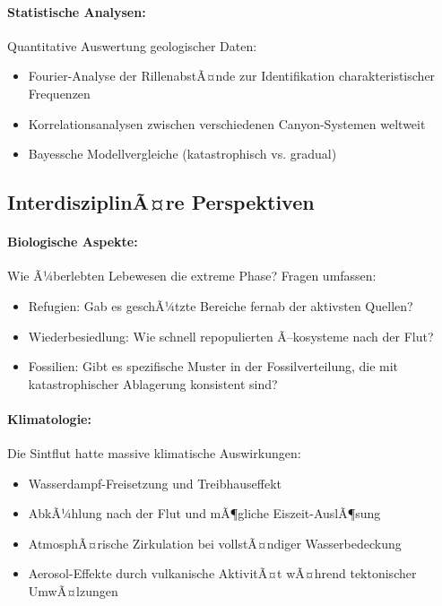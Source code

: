 ﻿\documentclass[12pt,a4paper]{report}
\begin{document}
\paragraph{Statistische Analysen:}
Quantitative Auswertung geologischer Daten:
\begin{itemize}
	\item Fourier-Analyse der RillenabstÃ¤nde zur Identifikation charakteristischer Frequenzen
	\item Korrelationsanalysen zwischen verschiedenen Canyon-Systemen weltweit
	\item Bayessche Modellvergleiche (katastrophisch vs. gradual)
\end{itemize}

\subsection{InterdisziplinÃ¤re Perspektiven}

\paragraph{Biologische Aspekte:}
Wie Ã¼berlebten Lebewesen die extreme Phase? Fragen umfassen:
\begin{itemize}
	\item Refugien: Gab es geschÃ¼tzte Bereiche fernab der aktivsten Quellen?
	\item Wiederbesiedlung: Wie schnell repopulierten Ã–kosysteme nach der Flut?
	\item Fossilien: Gibt es spezifische Muster in der Fossilverteilung, die mit katastrophischer Ablagerung konsistent sind?
\end{itemize}

\paragraph{Klimatologie:}
Die Sintflut hatte massive klimatische Auswirkungen:
\begin{itemize}
	\item Wasserdampf-Freisetzung und Treibhauseffekt
	\item AbkÃ¼hlung nach der Flut und mÃ¶gliche Eiszeit-AuslÃ¶sung
	\item AtmosphÃ¤rische Zirkulation bei vollstÃ¤ndiger Wasserbedeckung
	\item Aerosol-Effekte durch vulkanische AktivitÃ¤t wÃ¤hrend tektonischer UmwÃ¤lzungen
\end{itemize}
\end{document}
